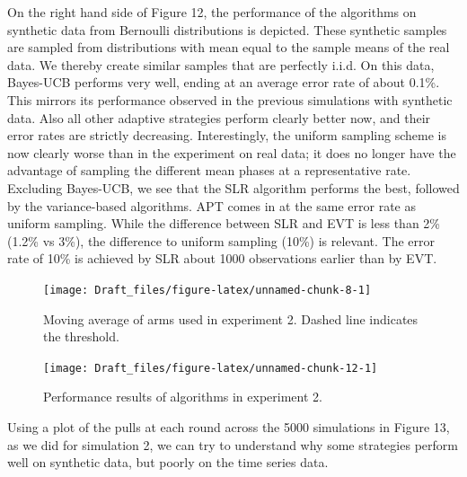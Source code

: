 \documentclass[11pt,]{article}
\begin{document}
On the right hand side of Figure 12, the performance of the algorithms
on synthetic data from Bernoulli distributions is depicted. These
synthetic samples are sampled from distributions with mean equal to the
sample means of the real data. We thereby create similar samples that
are perfectly i.i.d. On this data, Bayes-UCB performs very well, ending
at an average error rate of about 0.1\%. This mirrors its performance
observed in the previous simulations with synthetic data. Also all other
adaptive strategies perform clearly better now, and their error rates
are strictly decreasing. Interestingly, the uniform sampling scheme is
now clearly worse than in the experiment on real data; it does no longer
have the advantage of sampling the different mean phases at a
representative rate. Excluding Bayes-UCB, we see that the SLR algorithm
performs the best, followed by the variance-based algorithms. APT comes
in at the same error rate as uniform sampling. While the difference
between SLR and EVT is less than 2\% (1.2\% vs 3\%), the difference to
uniform sampling (10\%) is relevant. The error rate of 10\% is achieved
by SLR about 1000 observations earlier than by EVT.

\begin{figure}

{\centering \texttt{[image: Draft\_files/figure-latex/unnamed-chunk-8-1]} 

}

\caption{Moving average of arms used in experiment 2. Dashed line indicates the threshold.}\label{fig:unnamed-chunk-8}
\end{figure}

\begin{figure}

{\centering \texttt{[image: Draft\_files/figure-latex/unnamed-chunk-12-1]} 

}

\caption{Performance results of algorithms in experiment 2.}\label{fig:unnamed-chunk-12}
\end{figure}

Using a plot of the pulls at each round across the 5000 simulations in
Figure 13, as we did for simulation 2, we can try to understand why some
strategies perform well on synthetic data, but poorly on the time series
data.
\end{document}
